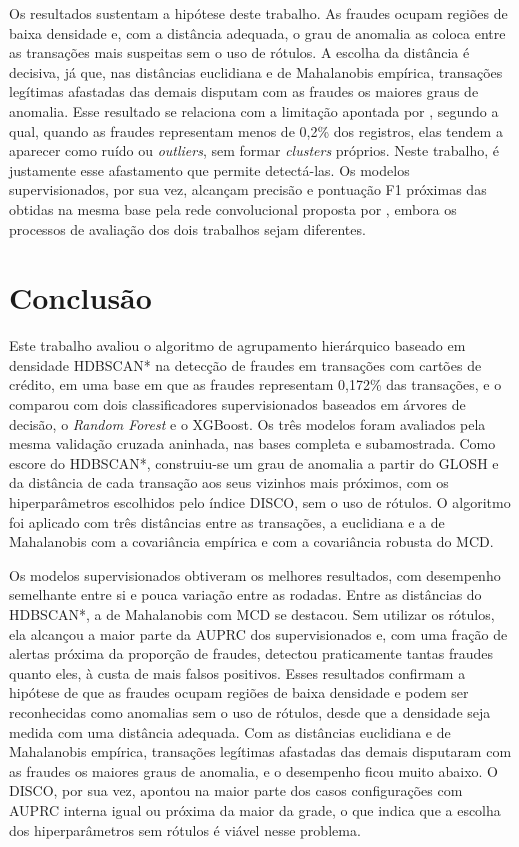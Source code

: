 \documentclass{uflamon}          %
\begin{document}
Os resultados sustentam a hipótese deste trabalho. As fraudes ocupam regiões de baixa densidade e, com a distância adequada, o grau de anomalia as coloca entre as transações mais suspeitas sem o uso de rótulos. A escolha da distância é decisiva, já que, nas distâncias euclidiana e de Mahalanobis empírica, transações legítimas afastadas das demais disputam com as fraudes os maiores graus de anomalia. Esse resultado se relaciona com a limitação apontada por , segundo a qual, quando as fraudes representam menos de 0,2\% dos registros, elas tendem a aparecer como ruído ou \textit{outliers}, sem formar \textit{clusters} próprios. Neste trabalho, é justamente esse afastamento que permite detectá-las. Os modelos supervisionados, por sua vez, alcançam precisão e pontuação F1 próximas das obtidas na mesma base pela rede convolucional proposta por , embora os processos de avaliação dos dois trabalhos sejam diferentes.

\chapter{Conclusão}
\label{cap:conclusao}

Este trabalho avaliou o algoritmo de agrupamento hierárquico baseado em densidade HDBSCAN* na detecção de fraudes em transações com cartões de crédito, em uma base em que as fraudes representam 0,172\% das transações, e o comparou com dois classificadores supervisionados baseados em árvores de decisão, o \textit{Random Forest} e o XGBoost. Os três modelos foram avaliados pela mesma validação cruzada aninhada, nas bases completa e subamostrada. Como escore do HDBSCAN*, construiu-se um grau de anomalia a partir do GLOSH e da distância de cada transação aos seus vizinhos mais próximos, com os hiperparâmetros escolhidos pelo índice DISCO, sem o uso de rótulos. O algoritmo foi aplicado com três distâncias entre as transações, a euclidiana e a de Mahalanobis com a covariância empírica e com a covariância robusta do MCD.

Os modelos supervisionados obtiveram os melhores resultados, com desempenho semelhante entre si e pouca variação entre as rodadas. Entre as distâncias do HDBSCAN*, a de Mahalanobis com MCD se destacou. Sem utilizar os rótulos, ela alcançou a maior parte da AUPRC dos supervisionados e, com uma fração de alertas próxima da proporção de fraudes, detectou praticamente tantas fraudes quanto eles, à custa de mais falsos positivos. Esses resultados confirmam a hipótese de que as fraudes ocupam regiões de baixa densidade e podem ser reconhecidas como anomalias sem o uso de rótulos, desde que a densidade seja medida com uma distância adequada. Com as distâncias euclidiana e de Mahalanobis empírica, transações legítimas afastadas das demais disputaram com as fraudes os maiores graus de anomalia, e o desempenho ficou muito abaixo. O DISCO, por sua vez, apontou na maior parte dos casos configurações com AUPRC interna igual ou próxima da maior da grade, o que indica que a escolha dos hiperparâmetros sem rótulos é viável nesse problema.
\end{document}
